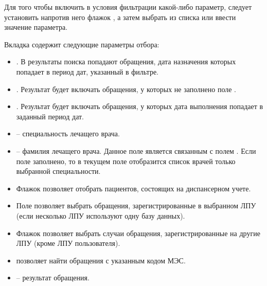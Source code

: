 Для того чтобы включить в условия фильтрации какой-либо параметр, следует установить напротив него флажок \putx , а затем выбрать из списка или ввести значение параметра.

Вкладка  содержит следующие параметры отбора:
\begin{itemize}
 \item {}. В результаты поиска попадают обращения, дата назначения которых попадает в период дат, указанный в фильтре.
 \item {}. Результат будет включать обращения, у которых не заполнено поле .
 \item {}. Результат будет включать обращения, у которых дата выполнения попадает в заданный период дат.
 \item {} – специальность лечащего врача.
 \item {} – фамилия лечащего врача. Данное поле является связанным с полем . Если поле  заполнено, то в текущем поле отобразится список врачей только выбранной специальности.
 \item Флажок  позволяет отобрать пациентов, состоящих на диспансерном учете.
 \item Поле  позволяет выбрать обращения, зарегистрированные в выбранном ЛПУ (если несколько ЛПУ используют одну базу данных).
 \item Флажок  позволяет выбрать случаи обращения, зарегистрированные на другие ЛПУ (кроме ЛПУ пользователя).
 \item {} позволяет найти обращения с указанным кодом МЭС.
 \item {} – результат обращения.
\end{itemize}
 
